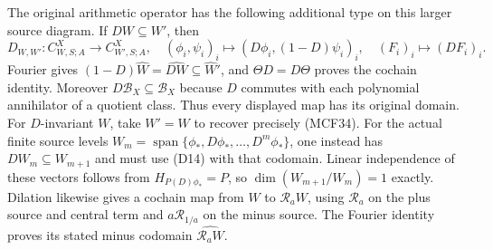 The original arithmetic operator has the following additional
type on this larger source diagram.  If $DW\subseteq W'$, then
\[
D_{W,W'}:C_{W,S;A}^X\longrightarrow C_{W',S;A}^X,
\quad(\phi_i,\psi_i)_i\longmapsto(D\phi_i,(1-D)\psi_i)_i,
\quad(F_i)_i\longmapsto(DF_i)_i.
\tag{D14}
\]
Fourier gives $(1-D)\widehat W=\widehat{DW}\subseteq\widehat W'$,
and $\Theta D=D\Theta$ proves the cochain identity.  Moreover
$D\mathscr B_X\subseteq\mathscr B_X$ because $D$ commutes with
each polynomial annihilator of a quotient class.  Thus every
displayed map has its original domain.  For $D$-invariant $W$,
take $W'=W$ to recover precisely (MCF34).  For the actual finite
source levels $W_m=\operatorname{span}\{\phi_*,D\phi_*,\ldots,D^m\phi_*\}$,
one instead has $DW_m\subseteq W_{m+1}$ and must use (D14) with
that codomain.  Linear independence of these vectors follows from
$H_{P(D)\phi_*}=P$, so $\dim(W_{m+1}/W_m)=1$ exactly.
Dilation likewise gives a cochain map from $W$ to $\mathcal R_aW$,
using $\mathcal R_a$ on the plus source and central term and
$a\mathcal R_{1/a}$ on the minus source.  The Fourier identity
proves its stated minus codomain $\widehat{\mathcal R_aW}$.
